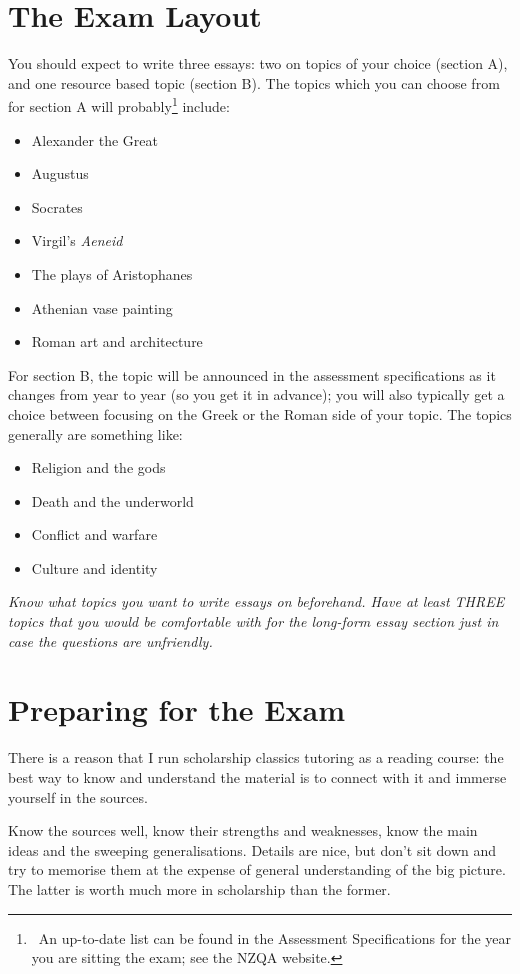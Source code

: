 \documentclass[a4paper,10pt]{article}
\begin{document}
\section{The Exam Layout}
You should expect to write three essays: two on topics of your choice (section A), and one resource based topic (section B). The topics
which you can choose from for section A will probably\footnote{~An up-to-date list can be found in the Assessment Specifications for the
year you are sitting the exam; see the NZQA website.} include:
\begin{itemize}
  \item Alexander the Great
  \item Augustus
  \item Socrates
  \item Virgil's \textit{Aeneid}
  \item The plays of Aristophanes
  \item Athenian vase painting
  \item Roman art and architecture
\end{itemize}

For section B, the topic will be announced in the assessment specifications as it changes from year to year (so you get it in advance); you
will also typically get a choice between focusing on the Greek or the Roman side of your topic. The topics generally are something like:
\begin{itemize}
  \item Religion and the gods
  \item Death and the underworld
  \item Conflict and warfare
  \item Culture and identity
\end{itemize}

\emph{Know what topics you want to write essays on beforehand. Have at least THREE topics that you would be comfortable with for the long-form
      essay section just in case the questions are unfriendly.}

\section{Preparing for the Exam}
There is a reason that I run scholarship classics tutoring as a reading course: the best way to know and understand the material
is to connect with it and immerse yourself in the sources.

Know the sources well, know their strengths and weaknesses, know the main ideas and the sweeping generalisations. Details are nice,
but don't sit down and try to memorise them at the expense of general understanding of the big picture. The latter is worth much
more in scholarship than the former.
\end{document}
